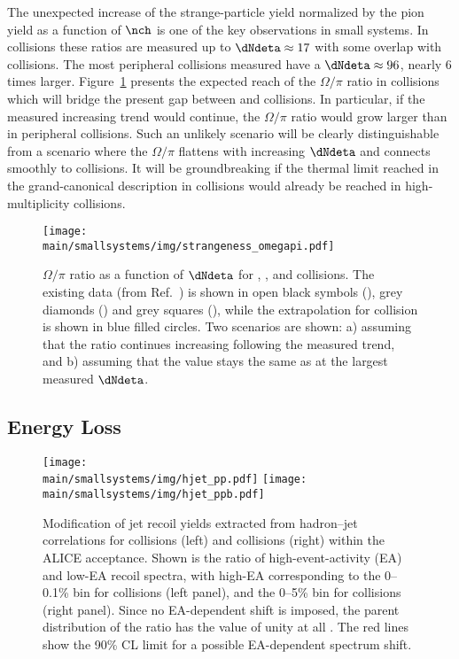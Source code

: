 \documentclass[../report.tex]{subfiles}
\providecommand{\main}{..}
\begin{document}
The unexpected increase of the strange-particle yield normalized by the pion yield as a function of $\nch$ is one of the key observations in small systems. In \pp collisions these ratios are measured up to $\dNdeta \approx 17$ with some overlap with \pPb collisions. The most peripheral \PbPb collisions measured have a $\dNdeta \approx 96$, nearly 6 times larger. Figure~\ref{fig:smallsystems_strangeness_omega_pi} presents the expected reach of the $\Omega/\pi$ ratio in \pp collisions which will bridge the present gap between \pp and \PbPb collisions. In particular, if the measured increasing trend would continue, the $\Omega/\pi$ ratio would grow larger than in peripheral \PbPb collisions. Such an unlikely scenario will be clearly distinguishable from a scenario where the $\Omega/\pi$ flattens with increasing $\dNdeta$ and connects smoothly to \PbPb collisions. It will be groundbreaking if the thermal limit reached in the grand-canonical description in \PbPb collisions would already be reached in high-multiplicity \pp collisions.

\begin{figure}[t]
\centering
\texttt{[image: \\main/smallsystems/img/strangeness\_omegapi.pdf]}

\caption{$\Omega/\pi$ ratio as a function of $\dNdeta$ for \pp, \pPb, and \PbPb collisions. The existing data (from Ref.~\cite{ALICE:2017jyt}) is shown in open black symbols (\pp), grey diamonds (\pPb) and grey squares (\PbPb), while the extrapolation for \pp collision is shown in blue filled circles. Two scenarios are shown: a) assuming that the ratio continues increasing following the measured trend, and b) assuming that the value stays the same as at the largest measured $\dNdeta$.}
\label{fig:smallsystems_strangeness_omega_pi}
\end{figure}

\subsection{Energy Loss}
\label{sect:smallsystems_energyloss}

\begin{figure}[t]
\centering
\texttt{[image: \\main/smallsystems/img/hjet\_pp.pdf]}
\hfill
\texttt{[image: \\main/smallsystems/img/hjet\_ppb.pdf]}
\caption{Modification of jet recoil yields extracted from hadron--jet correlations for \pp collisions (left) and \pPb collisions (right) within the ALICE acceptance. Shown is the ratio  of high-event-activity (EA) and low-EA recoil spectra, with high-EA corresponding to the  0--0.1\% bin for \pp collisions (left panel), and the 0--5\% bin for \pPb collisions (right panel). Since no EA-dependent shift is imposed, the parent distribution of the ratio has the value of unity at all \pT. The red lines show the 90\% CL limit for a possible EA-dependent spectrum shift.}
\label{fig:smallsystems_energyloss_hjet}
\end{figure}
\end{document}
